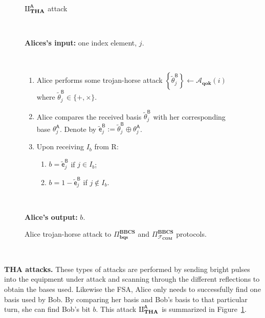 \begin{figure}[h!]
    \centering
        \begin{tcolorbox}
            
            \centerline{$\rotPi^{\mathsf{A}}_{\textbf{THA}}$ attack}
            
            \
            
            \textbf{Alices's input:}  one index element, $j$.
            
            \
            
            \begin{enumerate}
         \item Alice performs some trojan-horse attack $\left\{\tilde{\theta}^{\mathsf{B}}_{j}\right\} \leftarrow \mathcal{A}_{\textbf{qok}}(i) $ where $\tilde{\theta}^{\mathsf{B}}_{j}\in\{+, \times\}$.
         \item Alice compares the received basis $\tilde{\theta}^{\mathsf{B}}_{j}$ with her corresponding base $\theta^{\mathsf{A}}_{j}$. Denote by $\tilde{\mathsf{e}}^{\mathsf{B}}_j := \tilde{\theta}^{\mathsf{B}}_{j} \oplus \theta^{\mathsf{A}}_{j}$. 
         \item Upon receiving $I_b$ from R:
         \begin{enumerate}
             \item $b=\tilde{\mathsf{e}}^{\mathsf{B}}_j$ if $j\in I_b$;
             \item $b=1-\tilde{\mathsf{e}}^{\mathsf{B}}_j$ if $j\notin I_b$.
         \end{enumerate}
         
    \end{enumerate}    
            
            \
            
        \textbf{Alice's output:} $b$.

        
        \end{tcolorbox}
    \caption{Alice trojan-horse attack to $\Pi^{\textbf{BBCS}}_{\textbf{bqs}}$ and $\Pi^{\textbf{BBCS}}_{\mathcal{F}_\textbf{COM}}$ protocols.}
    \label{fig:A_THA}
\end{figure}

\

\noindent\textbf{THA attacks.} These types of attacks are performed by sending bright pulses into the equipment under attack and scanning through the different reflections to obtain the bases used. Likewise the FSA, Alice only needs to successfully find one basis used by Bob. By comparing her basis and Bob's basis to that particular turn, she can find Bob's bit $b$. This attack $\rotPi^{\mathsf{A}}_{\textbf{THA}}$ is summarized in Figure~\ref{fig:A_THA}. 

